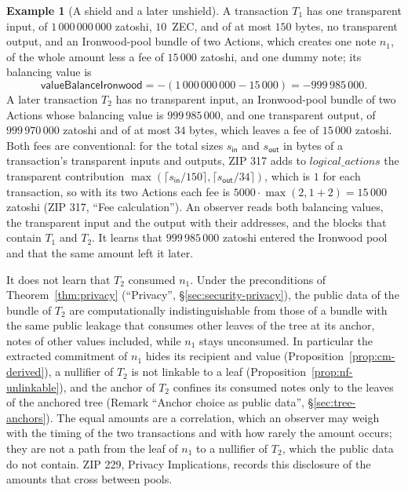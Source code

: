 \documentclass[11pt,a4paper]{article}
\theoremstyle{definition}
\newtheorem{example}[theorem]{Example}
\begin{document}
\begin{example}[A shield and a later unshield]\label{ex:shield-unshield}
A transaction $T_1$ has one transparent input, of $1\,000\,000\,000$
zatoshi, $10$~ZEC, and of at most $150$ bytes, no transparent output, and an
Ironwood-pool bundle of two Actions, which creates one note $n_1$, of the
whole amount less a fee of $15\,000$ zatoshi, and one dummy note; its
balancing value is
\[
  \mathsf{valueBalanceIronwood} = -(1\,000\,000\,000 - 15\,000)
    = -999\,985\,000 .
\]
A later transaction $T_2$ has no transparent input, an Ironwood-pool bundle
of two Actions whose balancing value is $999\,985\,000$, and one transparent
output, of $999\,970\,000$ zatoshi and of at most $34$ bytes, which leaves a
fee of $15\,000$ zatoshi. Both fees are conventional: for the total sizes
$s_{\mathsf{in}}$ and $s_{\mathsf{out}}$ in bytes of a transaction's
transparent inputs and outputs, ZIP 317 adds to $\mathit{logical\_actions}$
the transparent contribution $\max(\lceil s_{\mathsf{in}}/150 \rceil,
\lceil s_{\mathsf{out}}/34 \rceil)$, which is $1$ for each transaction, so
with its two Actions each fee is $5000 \cdot \max(2, 1 + 2) = 15\,000$
zatoshi (ZIP 317, ``Fee calculation'').
An observer reads both balancing values, the transparent input and the
output with their addresses, and the blocks that contain $T_1$ and $T_2$. It
learns that $999\,985\,000$ zatoshi entered the Ironwood pool and that the
same amount left it later.

It does not learn that $T_2$ consumed $n_1$. Under the preconditions of
Theorem~\ref{thm:privacy} (``Privacy'', \S\ref{sec:security-privacy}), the
public data of the bundle of $T_2$ are computationally indistinguishable from
those of a bundle with the same public leakage that consumes other leaves of
the tree at its anchor, notes of other values included, while $n_1$ stays
unconsumed. In particular the extracted commitment of $n_1$ hides its
recipient and value (Proposition~\ref{prop:cm-derived}), a nullifier of
$T_2$ is not linkable to a leaf (Proposition~\ref{prop:nf-unlinkable}), and
the anchor of $T_2$ confines its consumed notes only to the leaves of the
anchored tree (Remark ``Anchor choice as public data'',
\S\ref{sec:tree-anchors}). The equal amounts are a correlation, which an
observer may weigh with the timing of the two transactions and with how
rarely the amount occurs; they are not a path from the leaf of $n_1$ to a
nullifier of $T_2$, which the public data do not contain. ZIP 229, Privacy
Implications, records this disclosure of the amounts that cross between
pools.
\end{example}
\end{document}

